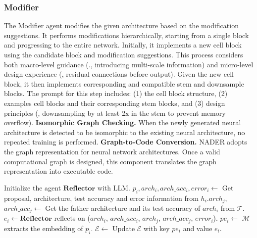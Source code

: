 \subsubsection{Modifier}
The Modifier agent modifies the given architecture based on the modification suggestions. It performs modifications hierarchically, starting from a single block and progressing to the entire network.
Initially, it implements a new cell block using the candidate block and modification suggestions. This process considers both macro-level guidance (\eg., introducing multi-scale information) and micro-level design experience (\eg, residual connections before output).
Given the new cell block, it then implements corresponding and compatible stem and downsample blocks. The prompt for this step includes: (1) the cell block structure, (2) examples cell blocks and their corresponding stem blocks, and (3) design principles (\eg, downsampling by at least 2x in the stem to prevent memory overflow).
\textbf{Isomorphic Graph Checking.} When the newly generated neural architecture is detected to be isomorphic to the existing neural architecture, no repeated training is performed.
\textbf{Graph-to-Code Conversion.} NADER adopts the graph representation for neural network architectures. Once a valid computational graph is designed, this component translates the graph representation into executable code.
\begin{algorithm}[t]
    \caption{Design experience extraction process}
    \begin{algorithmic}[1]
    \label{alg:reflector}
    \STATE Initialize the agent $\mathbf{Reflector}$ with LLM.
        \STATE $p_i, arch_i,arch\_acc_i,error_i\leftarrow$ Get proposal, architecture, test accuracy and error information from $h_i$.\STATE $arch_{j}$, $arch\_acc_{j}\leftarrow$ Get the father architecture and its test accuracy of $arch_i$ from $\mathcal{T}$.
        \STATE $e_i\leftarrow \mathbf{Reflector}$ reflects on ($arch_{i}$, $arch\_acc_{i}$, $arch_{j}$, $arch\_acc_{j}$, $error_i$).
        \STATE $pe_i\leftarrow$ $\mathcal{M}$ extracts the embedding of $p_i$.
        \STATE $\mathcal{E}\leftarrow$ Update $\mathcal{E}$ with key $pe_i$ and value $e_i$.
    \ENDFOR
    \end{algorithmic}
\end{algorithm}
